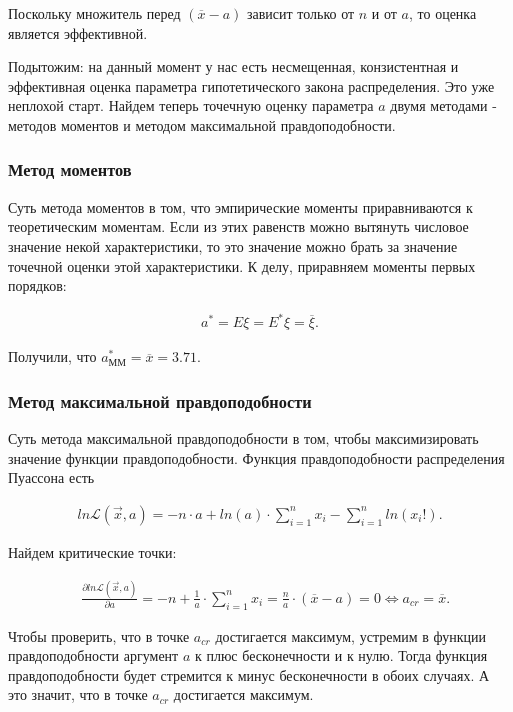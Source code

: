 \documentclass[14pt,a4paper]{scrartcl}
\theoremstyle{definition}
\theoremstyle{remark}
\theoremstyle{definition}
\theoremstyle{definition}
\begin{document}
Поскольку множитель перед $(\overline{x} - a)$ зависит только от $n$ и от $a$, то оценка является эффективной.

Подытожим: на данный момент у нас есть несмещенная, конзистентная и эффективная оценка параметра гипотетического закона распределения. Это уже неплохой старт. Найдем теперь точечную оценку параметра $a$ двумя методами - методов моментов и методом максимальной правдоподобности.

\subsubsection{Метод моментов}

Суть метода моментов в том, что эмпирические моменты приравниваются к теоретическим моментам. Если из этих равенств можно вытянуть числовое значение некой характеристики, то это значение можно брать за значение точечной оценки этой характеристики. К делу, приравняем моменты первых порядков:

\begin{align*}
  a^{*} = E\xi = E^{*}\xi = \overline{\xi}.
\end{align*}

Получили, что $a_{\text{ММ}}^{*} = \overline{x} = 3.71.$

\subsubsection{Метод максимальной правдоподобности}

Суть метода максимальной правдоподобности в том, чтобы максимизировать значение функции правдоподобности. Функция правдоподобности распределения Пуассона есть

\begin{align*}
  ln \mathcal{L}(\vec{x}, a) = -n\cdot a + ln(a)\cdot \sum_{i = 1}^{n} x_i - \sum_{i = 1}^{n} ln(x_i!).
\end{align*}

Найдем критические точки:

\begin{align*}
  &\frac{\partial ln \mathcal{L}(\vec{x}, a)}{\partial a} = -n + \frac{1}{a}\cdot \sum_{i = 1}^{n} x_i = \frac{n}{a}\cdot (\overline{x} - a) = 0 \iff a_{cr} = \overline{x}.
\end{align*}

Чтобы проверить, что в точке $a_{cr}$ достигается максимум, устремим в функции правдоподобности аргумент $a$ к плюс бесконечности и к нулю. Тогда функция правдоподобности будет стремится к минус бесконечности в обоих случаях. А это значит, что в точке $a_{cr}$ достигается максимум.
\end{document}
